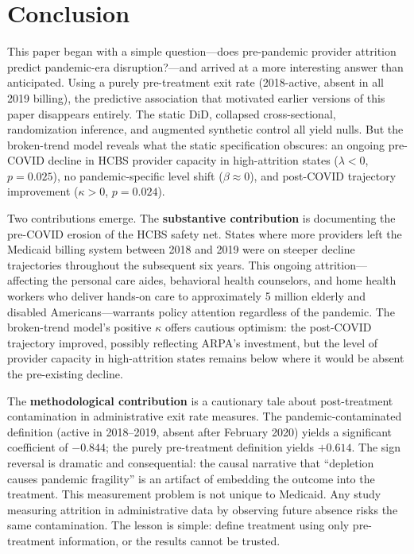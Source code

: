 \documentclass[12pt]{article}
\begin{document}
\section{Conclusion}

This paper began with a simple question---does pre-pandemic provider attrition predict pandemic-era disruption?---and arrived at a more interesting answer than anticipated. Using a purely pre-treatment exit rate (2018-active, absent in all 2019 billing), the predictive association that motivated earlier versions of this paper disappears entirely. The static DiD, collapsed cross-sectional, randomization inference, and augmented synthetic control all yield nulls. But the broken-trend model reveals what the static specification obscures: an ongoing pre-COVID decline in HCBS provider capacity in high-attrition states ($\lambda < 0$, $p = 0.025$), no pandemic-specific level shift ($\beta \approx 0$), and post-COVID trajectory improvement ($\kappa > 0$, $p = 0.024$).

Two contributions emerge. The \textbf{substantive contribution} is documenting the pre-COVID erosion of the HCBS safety net. States where more providers left the Medicaid billing system between 2018 and 2019 were on steeper decline trajectories throughout the subsequent six years. This ongoing attrition---affecting the personal care aides, behavioral health counselors, and home health workers who deliver hands-on care to approximately 5 million elderly and disabled Americans---warrants policy attention regardless of the pandemic. The broken-trend model's positive $\kappa$ offers cautious optimism: the post-COVID trajectory improved, possibly reflecting ARPA's investment, but the level of provider capacity in high-attrition states remains below where it would be absent the pre-existing decline.

The \textbf{methodological contribution} is a cautionary tale about post-treatment contamination in administrative exit rate measures. The pandemic-contaminated definition (active in 2018--2019, absent after February 2020) yields a significant coefficient of $-0.844$; the purely pre-treatment definition yields $+0.614$. The sign reversal is dramatic and consequential: the causal narrative that ``depletion causes pandemic fragility'' is an artifact of embedding the outcome into the treatment. This measurement problem is not unique to Medicaid. Any study measuring attrition in administrative data by observing future absence risks the same contamination. The lesson is simple: define treatment using only pre-treatment information, or the results cannot be trusted.
\end{document}
